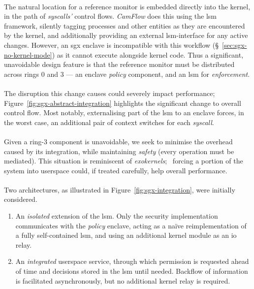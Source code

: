 \paragraph{} The natural location for a reference monitor is embedded directly into the kernel, in the path of \textit{syscalls'} control flows. \textit{CamFlow} does this using the \acrshort{lsm} framework, silently tagging processes and other entities as they are encountered by the kernel, and additionally providing an external \acrshort{lsm}-interface for any active changes. However, an \acrshort{sgx} enclave is incompatible with this workflow (§~\ref{sec:sgx-no-kernel-mode}) as it cannot execute alongside kernel code. Thus a significant, unavoidable design feature is that the reference monitor must be distributed across rings 0 and 3 --- an enclave \textit{policy} component, and an \acrshort{lsm} for \textit{enforcement}.

\paragraph{} The disruption this change causes could severely impact performance; Figure~\ref{fig:sgx-abstract-integration} highlights the significant change to overall control flow. Most notably, externalising part of the \acrshort{lsm} to an enclave forces, in the worst case, an additional pair of context switches for each \textit{syscall}.

\paragraph{} Given a ring-3 component is unavoidable, we seek to minimise the overhead caused by its integration, while maintaining \textit{safety} (every operation must be mediated). This situation is reminiscent of \textit{exokernels};~\cite{10.1145/224056.224076} forcing a portion of the system into userspace could, if treated carefully, help overall performance.~\cite{10.1145/269005.266644} 

\paragraph{} Two architectures, as illustrated in Figure~\ref{fig:sgx-integration}, were initially considered. 

\begin{enumerate}
    \item An \textit{isolated} extension of the \acrshort{lsm}. Only the security implementation communicates with the \textit{policy} enclave, acting as a na\"{i}ve reimplementation of a fully self-contained \acrshort{lsm}, and using an additional kernel module as an \acrshort{io} relay.
    \item An \textit{integrated} userspace service, through which permission is requested ahead of time and decisions stored in the \acrshort{lsm} until needed. Backflow of information is facilitated asynchronously, but no additional kernel relay is required.
\end{enumerate}



